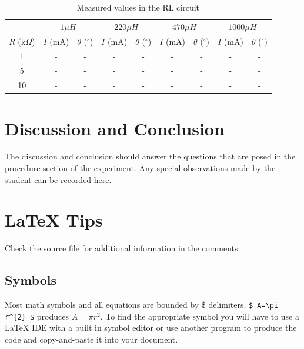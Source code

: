 \documentclass[12pt]{article}
\begin{document}
\begin{table}[h]
	\centering
	\begin{tabular}{c c c c c c c c c}
		\toprule
		& \multicolumn{2}{c}{$1 \mu H$}	& \multicolumn{2}{c}{$220 \mu H$} & \multicolumn{2}{c}{$470 \mu H$} & \multicolumn{2}{c}{$1000 \mu H$} \\
		\cline{2-9}
		$R$ (k$\Omega$)	& \multicolumn{1}{c}{$I$ (mA)} 	& \multicolumn{1}{c}{$\theta$ ($^\circ$)} 	& \multicolumn{1}{c}{$I$ (mA)} 	& \multicolumn{1}{c}{$\theta$ ($^\circ$)}	& \multicolumn{1}{c}{$I$ (mA)} 	& \multicolumn{1}{c}{$\theta$ ($^\circ$)}	& \multicolumn{1}{c}{$I$ (mA)} 	& \multicolumn{1}{c}{$\theta$ ($^\circ$)} \\
		\hline
		1		& -		& -		& -		& -		& -		& -		& -		& -	\\
		5		& -		& -		& -		& -		& -		& -		& -		& - \\
		10		& -		& -		& -		& -		& -		& -		& -		& - \\
		\toprule
	\end{tabular}
	\caption{Measured values in the RL circuit}
	\label{table:rl_meas}
\end{table}

\section{Discussion and Conclusion}\label{sec:d_and_c}
The discussion and conclusion should answer the questions that are posed in the procedure section of the experiment. Any special observations made by the student can be recorded here.



\pagebreak

\section{LaTeX Tips}\label{sec:tips}
Check the source file for additional information in the comments.
\subsection{Symbols}\label{sec:symbols}
Most math symbols and all equations are bounded by \$ delimiters. \verb|$ A=\pi r^{2} $| produces $ A=\pi r^{2} $. To find the appropriate symbol you will have to use a LaTeX IDE with a built in symbol editor or use another program to produce the code and copy-and-paste it into your document.
\end{document}
